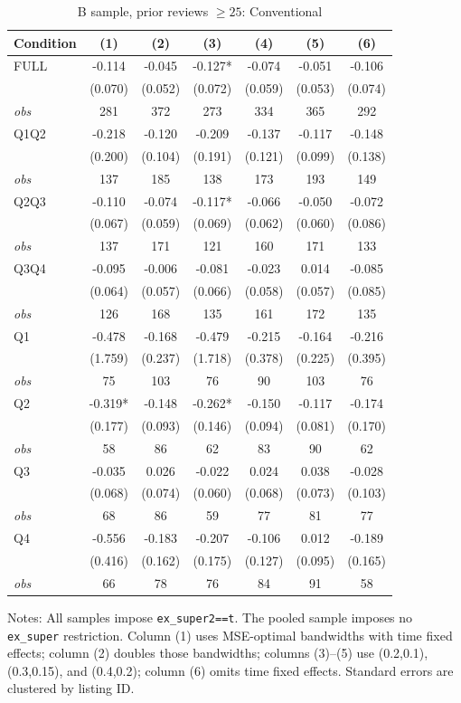 \begin{table}[!htbp]
\centering
\caption{B sample, prior reviews $\geq25$: Conventional}
\begin{tabular}{lcccccc}
\toprule
Condition & (1) & (2) & (3) & (4) & (5) & (6) \\
\midrule
FULL & -0.114 & -0.045 & -0.127* & -0.074 & -0.051 & -0.106 \\
 & (0.070) & (0.052) & (0.072) & (0.059) & (0.053) & (0.074) \\
\textit{obs} & 281 & 372 & 273 & 334 & 365 & 292 \\
Q1Q2 & -0.218 & -0.120 & -0.209 & -0.137 & -0.117 & -0.148 \\
 & (0.200) & (0.104) & (0.191) & (0.121) & (0.099) & (0.138) \\
\textit{obs} & 137 & 185 & 138 & 173 & 193 & 149 \\
Q2Q3 & -0.110 & -0.074 & -0.117* & -0.066 & -0.050 & -0.072 \\
 & (0.067) & (0.059) & (0.069) & (0.062) & (0.060) & (0.086) \\
\textit{obs} & 137 & 171 & 121 & 160 & 171 & 133 \\
Q3Q4 & -0.095 & -0.006 & -0.081 & -0.023 & 0.014 & -0.085 \\
 & (0.064) & (0.057) & (0.066) & (0.058) & (0.057) & (0.085) \\
\textit{obs} & 126 & 168 & 135 & 161 & 172 & 135 \\
Q1 & -0.478 & -0.168 & -0.479 & -0.215 & -0.164 & -0.216 \\
 & (1.759) & (0.237) & (1.718) & (0.378) & (0.225) & (0.395) \\
\textit{obs} & 75 & 103 & 76 & 90 & 103 & 76 \\
Q2 & -0.319* & -0.148 & -0.262* & -0.150 & -0.117 & -0.174 \\
 & (0.177) & (0.093) & (0.146) & (0.094) & (0.081) & (0.170) \\
\textit{obs} & 58 & 86 & 62 & 83 & 90 & 62 \\
Q3 & -0.035 & 0.026 & -0.022 & 0.024 & 0.038 & -0.028 \\
 & (0.068) & (0.074) & (0.060) & (0.068) & (0.073) & (0.103) \\
\textit{obs} & 68 & 86 & 59 & 77 & 81 & 77 \\
Q4 & -0.556 & -0.183 & -0.207 & -0.106 & 0.012 & -0.189 \\
 & (0.416) & (0.162) & (0.175) & (0.127) & (0.095) & (0.165) \\
\textit{obs} & 66 & 78 & 76 & 84 & 91 & 58 \\
\bottomrule
\end{tabular}
\begin{minipage}{0.98\textwidth}\footnotesize
Notes: All samples impose \texttt{ex\_super2==t}. The pooled sample imposes no \texttt{ex\_super} restriction. Column (1) uses MSE-optimal bandwidths with time fixed effects; column (2) doubles those bandwidths; columns (3)--(5) use (0.2,0.1), (0.3,0.15), and (0.4,0.2); column (6) omits time fixed effects. Standard errors are clustered by listing ID.
\end{minipage}
\end{table}

